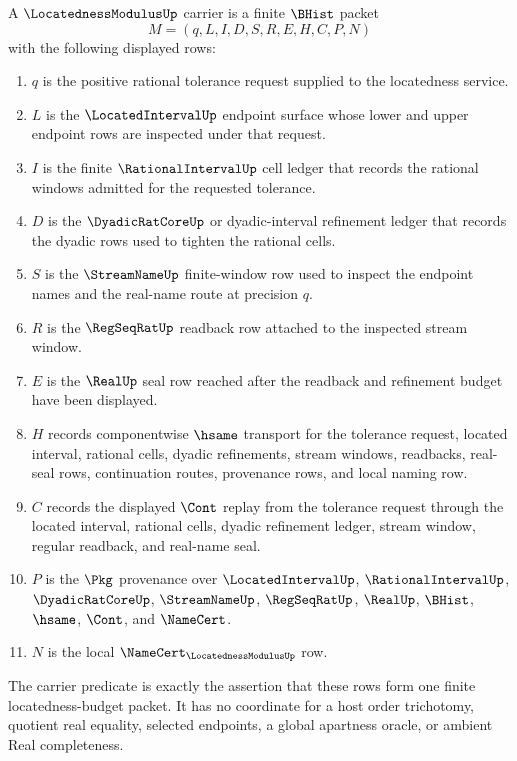 \begin{definition}
\label{def:locatedness-modulus-carrier}
A $\LocatednessModulusUp$ carrier is a finite $\BHist$ packet
$$
M=(q,L,I,D,S,R,E,H,C,P,N)
$$
with the following displayed rows:
\begin{enumerate}
\item $q$ is the positive rational tolerance request supplied to the locatedness service.
\item $L$ is the $\LocatedIntervalUp$ endpoint surface whose lower and upper endpoint rows are inspected under that request.
\item $I$ is the finite $\RationalIntervalUp$ cell ledger that records the rational windows admitted for the requested tolerance.
\item $D$ is the $\DyadicRatCoreUp$ or dyadic-interval refinement ledger that records the dyadic rows used to tighten the rational cells.
\item $S$ is the $\StreamNameUp$ finite-window row used to inspect the endpoint names and the real-name route at precision $q$.
\item $R$ is the $\RegSeqRatUp$ readback row attached to the inspected stream window.
\item $E$ is the $\RealUp$ seal row reached after the readback and refinement budget have been displayed.
\item $H$ records componentwise $\hsame$ transport for the tolerance request, located interval, rational cells, dyadic refinements, stream windows, readbacks, real-seal rows, continuation routes, provenance rows, and local naming row.
\item $C$ records the displayed $\Cont$ replay from the tolerance request through the located interval, rational cells, dyadic refinement ledger, stream window, regular readback, and real-name seal.
\item $P$ is the $\Pkg$ provenance over $\LocatedIntervalUp$, $\RationalIntervalUp$, $\DyadicRatCoreUp$, $\StreamNameUp$, $\RegSeqRatUp$, $\RealUp$, $\BHist$, $\hsame$, $\Cont$, and $\NameCert$.
\item $N$ is the local $\NameCert_{\LocatednessModulusUp}$ row.
\end{enumerate}
The carrier predicate is exactly the assertion that these rows form one finite locatedness-budget packet. It has no coordinate for a host order trichotomy, quotient real equality, selected endpoints, a global apartness oracle, or ambient Real completeness.
\end{definition}

